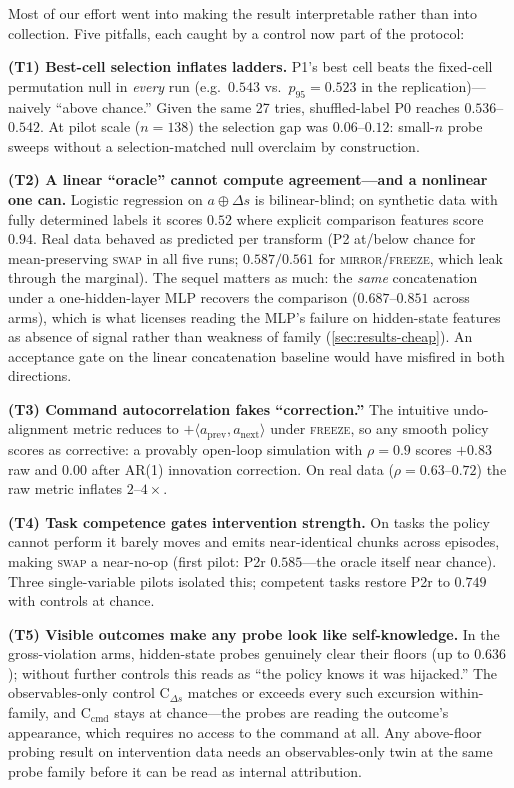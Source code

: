 \documentclass{article}
\begin{document}
Most of our effort went into making the result interpretable rather than
into collection. Five pitfalls, each caught by a control now part of the
protocol:

\textbf{(T1) Best-cell selection inflates ladders.} P1's best cell beats
the fixed-cell permutation null in \emph{every} run (e.g.\ $0.543$ vs.\
$p_{95}{=}0.523$ in the replication)---naively ``above chance.'' Given the
same 27 tries, shuffled-label P0 reaches $0.536$--$0.542$. At pilot scale
($n{=}138$) the selection gap was $0.06$--$0.12$: small-$n$ probe sweeps
without a selection-matched null overclaim by construction.

\textbf{(T2) A linear ``oracle'' cannot compute agreement---and a nonlinear
one can.} Logistic regression on $a \oplus \Delta s$ is bilinear-blind; on
synthetic data with fully determined labels it scores $0.52$ where explicit
comparison features score $0.94$. Real data behaved as predicted per
transform (P2 at/below chance for mean-preserving \textsc{swap} in all five
runs; $0.587/0.561$ for \textsc{mirror}/\textsc{freeze}, which leak through
the marginal). The sequel matters as much: the \emph{same} concatenation
under a one-hidden-layer MLP recovers the comparison ($0.687$--$0.851$
across arms), which is what licenses reading the MLP's failure on
hidden-state features as absence of signal rather than weakness of family
(\cref{sec:results-cheap}). An acceptance gate on the linear concatenation
baseline would have misfired in both directions.

\textbf{(T3) Command autocorrelation fakes ``correction.''} The intuitive
undo-alignment metric reduces to $+\langle a_{\text{prev}},
a_{\text{next}}\rangle$ under \textsc{freeze}, so any smooth policy scores
as corrective: a provably open-loop simulation with $\rho{=}0.9$ scores
$+0.83$ raw and $0.00$ after AR(1) innovation correction. On real data
($\rho{=}0.63$--$0.72$) the raw metric inflates $2$--$4\times$.

\textbf{(T4) Task competence gates intervention strength.} On tasks the
policy cannot perform it barely moves and emits near-identical chunks across
episodes, making \textsc{swap} a near-no-op (first pilot: P2r $0.585$---the
oracle itself near chance). Three single-variable pilots isolated this;
competent tasks restore P2r to $0.749$ with controls at chance.

\textbf{(T5) Visible outcomes make any probe look like self-knowledge.}
In the gross-violation arms, hidden-state probes genuinely clear their
floors (up to $0.636$); without further controls this reads as ``the policy
knows it was hijacked.'' The observables-only control C$_{\Delta s}$
matches or exceeds every such excursion within-family, and C$_{\text{cmd}}$
stays at chance---the probes are reading the outcome's appearance, which
requires no access to the command at all. Any above-floor probing result on
intervention data needs an observables-only twin at the same probe family
before it can be read as internal attribution.
\end{document}
